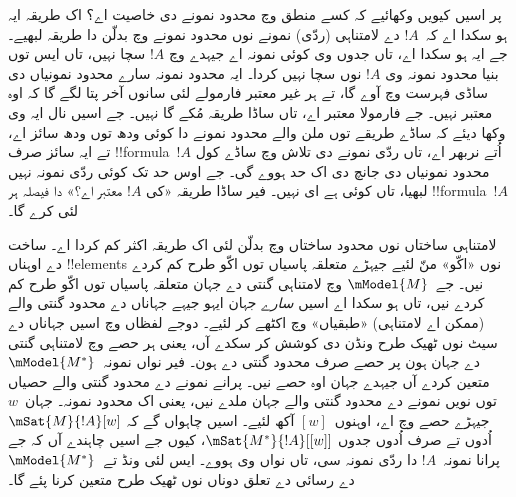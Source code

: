 \documentclass[../../../include/open-logic-section]{subfiles}
\begin{document}
پر اسیں کیویں وکھائیے کہ کسے منطق وچ محدود نمونے دی خاصیت اے؟ اک طریقہ ایہ ہو سکدا اے کہ~$!A$ دے لامتناہی (ردّی) نمونے نوں محدود نمونے وچ بدلّن دا طریقہ لبھیے۔ جے ایہ ہو سکدا اے، تاں جدوں وی کوئی نمونہ اے جیہدے وچ $!A$ سچا نہیں، تاں ایس توں بنیا محدود نمونہ وی $!A$ نوں سچا نہیں کردا۔ ایہ محدود نمونہ سارے محدود نمونیاں دی ساڈی فہرست وچ آوے گا، تے ہر غیر معتبر فارمولے لئی سانوں آخر پتا لگے گا کہ اوہ معتبر نہیں۔ جے فارمولا معتبر اے، تاں ساڈا طریقہ مُکے گا نہیں۔ جے اسیں نال ایہ وی وکھا دیئے کہ ساڈے طریقے توں ملن والے محدود نمونے دا کوئی ودھ توں ودھ سائز اے، تے ایہ سائز صرف !!{formula}~$!A$ اُتے نربھر اے، تاں ردّی نمونے دی تلاش وچ ساڈے کول محدود نمونیاں دی جانچ دی اک حد ہووے گی۔ جے اوس حد تک کوئی ردّی نمونہ نہیں لبھیا، تاں کوئی ہے ای نہیں۔ فیر ساڈا طریقہ «کی $!A$ معتبر اے؟» دا فیصلہ ہر !!{formula}~$!A$ لئی کرے گا۔

لامتناہی ساختاں نوں محدود ساختاں وچ بدلّن لئی اک طریقہ اکثر کم کردا اے۔ ساخت دے اوہناں !!{element}s نوں «اکّو» منّ لئیے جیہڑے متعلقہ پاسیاں توں اکّو طرح کم کردے نیں۔ جے~$\mModel{M}$ وچ لامتناہی گنتی دے جہان متعلقہ پاسیاں توں اکّو طرح کم کردے نیں، تاں ہو سکدا اے اسیں \emph{سارے} جہان ایہو جیہے جہاناں دے محدود گنتی والے (ممکن اے لامتناہی) «طبقیاں» وچ اکٹھے کر لئیے۔ دوجے لفظاں وچ اسیں جہاناں دے سیٹ نوں ٹھیک طرح ونڈن دی کوشش کر سکدے آں، یعنی ہر حصے وچ لامتناہی گنتی دے جہان ہون پر حصے صرف محدود گنتی دے ہون۔ فیر نواں نمونہ~$\mModel{M^*}$ متعین کردے آں جیہدے جہان اوہ حصے نیں۔ پرانے نمونے دے محدود گنتی والے حصیاں توں نویں نمونے دے محدود گنتی والے جہان ملدے نیں، یعنی اک محدود نمونہ۔ جہان~$w$ جیہڑے حصے وچ اے، اوہنوں~$[w]$ آکھ لئیے۔ اسیں چاہواں گے کہ $\mSat{M}{!A}[w]$ اُدوں تے صرف اُدوں جدوں
$\mSat{M^*}{!A}[{[w]}]$، کیوں جے اسیں چاہندے آں کہ جے پرانا نمونہ~$!A$ دا ردّی نمونہ سی، تاں نواں وی ہووے۔ ایس لئی ونڈ تے~$\mModel{M^*}$ دے رسائی دے تعلق دوناں نوں ٹھیک طرح متعین کرنا پئے گا۔
\end{document}
